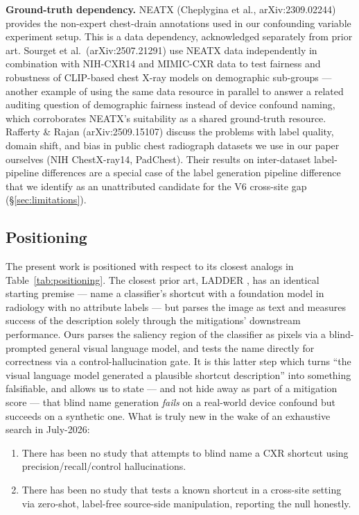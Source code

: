 \documentclass{ieeeaccess}
\begin{document}
\textbf{Ground-truth dependency.} NEATX (Cheplygina et al., arXiv:2309.02244) \cite{neatx} provides the non-expert chest-drain annotations used in our confounding variable experiment setup. This is a data dependency, acknowledged separately from prior art. Sourget et al.\ (arXiv:2507.21291) \cite{sourget2025} use NEATX data independently in combination with NIH-CXR14 and MIMIC-CXR data to test fairness and robustness of CLIP-based chest X-ray models on demographic sub-groups --- another example of using the same data resource in parallel to answer a related auditing question of demographic fairness instead of device confound naming, which corroborates NEATX's suitability as a shared ground-truth resource. Rafferty \& Rajan (arXiv:2509.15107) \cite{rafferty2026} discuss the problems with label quality, domain shift, and bias in public chest radiograph datasets we use in our paper ourselves (NIH ChestX-ray14, PadChest). Their results on inter-dataset label-pipeline differences are a special case of the label generation pipeline difference that we identify as an unattributed candidate for the V6 cross-site gap (\S\ref{sec:limitations}).

\subsection{Positioning}
The present work is positioned with respect to its closest analogs in Table~\ref{tab:positioning}. The closest prior art, LADDER \cite{ladder}, has an identical starting premise --- name a classifier's shortcut with a foundation model in radiology with no attribute labels --- but parses the image as text and measures success of the description solely through the mitigations' downstream performance. Ours parses the saliency region of the classifier as pixels via a blind-prompted general visual language model, and tests the name directly for correctness via a control-hallucination gate. It is this latter step which turns ``the visual language model generated a plausible shortcut description'' into something falsifiable, and allows us to state --- and not hide away as part of a mitigation score --- that blind name generation \emph{fails} on a real-world device confound but succeeds on a synthetic one. What is truly new in the wake of an exhaustive search in July-2026:
\begin{enumerate}
\item There has been no study that attempts to blind name a CXR shortcut using precision/recall/control hallucinations.
\item There has been no study that tests a known shortcut in a cross-site setting via zero-shot, label-free source-side manipulation, reporting the null honestly.
\end{enumerate}
\end{document}
